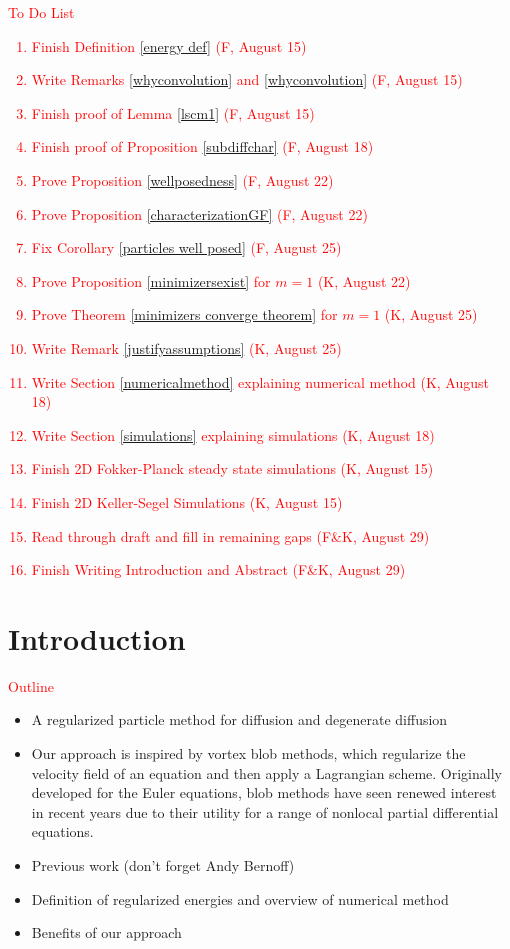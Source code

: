 \documentclass[11pt,leqno]{amsart}
\theoremstyle{definition}
\begin{document}
\textcolor{red}{To Do List
\begin{enumerate}
\item Finish Definition \ref{energy def}  (F, August 15)
\item Write Remarks \ref{whyconvolution} and \ref{whyconvolution} (F, August 15)
\item Finish proof of Lemma \ref{lscm1} (F, August 15)
\item Finish proof of Proposition \ref{subdiffchar} (F, August 18)
\item Prove Proposition \ref{wellposedness} (F, August 22)
\item Prove Proposition \ref{characterizationGF} (F, August 22)
\item Fix Corollary \ref{particles well posed} (F, August 25)
\item Prove Proposition \ref{minimizersexist} for $m=1$ (K, August 22)
\item Prove Theorem \ref{minimizers converge theorem} for $m=1$ (K, August 25)
\item Write Remark \ref{justifyassumptions} (K, August 25)
\item Write Section \ref{numericalmethod} explaining numerical method (K, August 18)
\item Write Section \ref{simulations} explaining simulations (K, August 18)
\item Finish 2D Fokker-Planck steady state simulations (K, August 15)
\item Finish 2D Keller-Segel Simulations (K, August 15)
\item Read through draft and fill in remaining gaps (F\&K, August 29)
\item Finish Writing Introduction and Abstract (F\&K, August 29)
\end{enumerate}}

\section{Introduction}
\textcolor{red}{Outline}
\begin{itemize}
\item A regularized particle method for diffusion and degenerate diffusion
\item Our approach is inspired by vortex blob methods, which regularize the velocity field of an equation and then apply a Lagrangian scheme. Originally developed for the Euler equations, blob methods have seen renewed interest in recent years due to their utility for a range of nonlocal partial differential equations.
\item Previous work (don't forget Andy Bernoff)
\item Definition of regularized energies and overview of numerical method
\item Benefits of our approach
\end{itemize}
\end{document}

